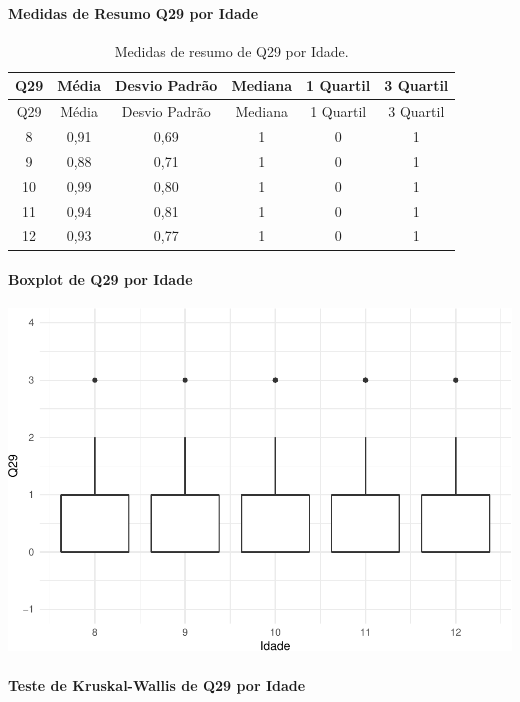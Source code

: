 \documentclass[]{article}
\let\oldparagraph\paragraph
\renewcommand{\paragraph}[1]{\oldparagraph{#1}\mbox{}}
\begin{document}
\cleardoublepage

\hypertarget{medidas-de-resumo-q29-por-idade}{%
\paragraph{Medidas de Resumo Q29 por Idade}\label{medidas-de-resumo-q29-por-idade}}

\begin{longtable}[]{@{}cccccc@{}}
\caption{\label{tab:unnamed-chunk-921}Medidas de resumo de Q29 por Idade.}\tabularnewline
\toprule
Q29 & Média & Desvio Padrão & Mediana & 1 Quartil & 3 Quartil\tabularnewline
\midrule
\endfirsthead
\toprule
Q29 & Média & Desvio Padrão & Mediana & 1 Quartil & 3 Quartil\tabularnewline
\midrule
\endhead
8 & 0,91 & 0,69 & 1 & 0 & 1\tabularnewline
9 & 0,88 & 0,71 & 1 & 0 & 1\tabularnewline
10 & 0,99 & 0,80 & 1 & 0 & 1\tabularnewline
11 & 0,94 & 0,81 & 1 & 0 & 1\tabularnewline
12 & 0,93 & 0,77 & 1 & 0 & 1\tabularnewline
\bottomrule
\end{longtable}

\hypertarget{boxplot-de-q29-por-idade}{%
\paragraph{Boxplot de Q29 por Idade}\label{boxplot-de-q29-por-idade}}

\begin{center}\includegraphics[width=0.75\linewidth]{relatorio_covid19_files/figure-latex/unnamed-chunk-922-1} \end{center}

\hypertarget{teste-de-kruskal-wallis-de-q29-por-idade}{%
\paragraph{Teste de Kruskal-Wallis de Q29 por Idade}\label{teste-de-kruskal-wallis-de-q29-por-idade}}
\end{document}
